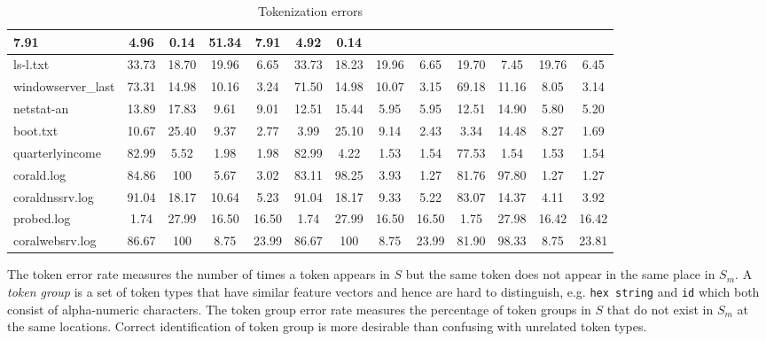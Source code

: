 \begin{table}[th]
\begin{center}
\begin{tabular}{|l||c|c|c|c||c|c|c|c||c|c|c|c|}
7.91
                     & 4.96  & 0.14  & 51.34 & 7.91     & 4.92  & 0.14  \\ \hline
ls-l.txt                   & 33.73 & 18.70 & 19.96 & 6.65  & 33.73 &
               18.23 & 19.96 & 6.65  & 19.70 & 7.45  & 19.76 & 6.45  \\ \hline
windowserver\_last     & 73.31 & 14.98 & 10.16 & 3.24  & 71.50 &
               14.98 & 10.07 & 3.15  & 69.18 & 11.16 & 8.05  & 3.14  \\ \hline
netstat-an                 & 13.89 & 17.83 & 9.61  & 9.01  & 12.51 &
               15.44 & 5.95  & 5.95  & 12.51 & 14.90 & 5.80  & 5.20  \\ \hline
boot.txt                   & 10.67 & 25.40 & 9.37  & 2.77  & 3.99 &
               25.10 & 9.14  & 2.43  & 3.34  & 14.48 & 8.27  & 1.69  \\ \hline
quarterlyincome    & 82.99 & 5.52  & 1.98  & 1.98     & 82.99 &
               4.22  & 1.53  & 1.54     & 77.53 & 1.54  & 1.53  & 1.54     \\ \hline
corald.log            & 84.86 & 100   & 5.67  & 3.02     & 83.11 &
               98.25 & 3.93  & 1.27     & 81.76 & 97.80 & 1.27  & 1.27     \\ \hline
coraldnssrv.log       & 91.04 & 18.17 & 10.64 & 5.23  & 91.04 &
               18.17 & 9.33  & 5.22  & 83.07 & 14.37 & 4.11  & 3.92  \\ \hline
probed.log            & 1.74  & 27.99 & 16.50 & 16.50 & 1.74  &
               27.99 & 16.50 & 16.50 & 1.75  & 27.98 & 16.42 & 16.42 \\ \hline
coralwebsrv.log       & 86.67 & 100   & 8.75  & 23.99 & 86.67 &
               100   & 8.75  & 23.99     & 81.90 & 98.33 & 8.75  & 23.81     \\
               \hline
\end{tabular}
\sk
\caption{Tokenization errors} \shrink 
\label{tab:error}
\end{center}
\end{table}
The token error rate measures the number of times a token appears in
$S$ but the same token does not appear in the same place in $S_m$.
A {\em token group} is a set of token types that have similar
feature vectors and hence are hard to distinguish, e.g.
{\tt hex string} and {\tt id} which both consist of alpha-numeric
characters. The token group error rate measures the percentage of 
token groups in $S$ that do not exist in $S_m$ at the same locations.
Correct identification of token group is more desirable than confusing
with unrelated token types.
